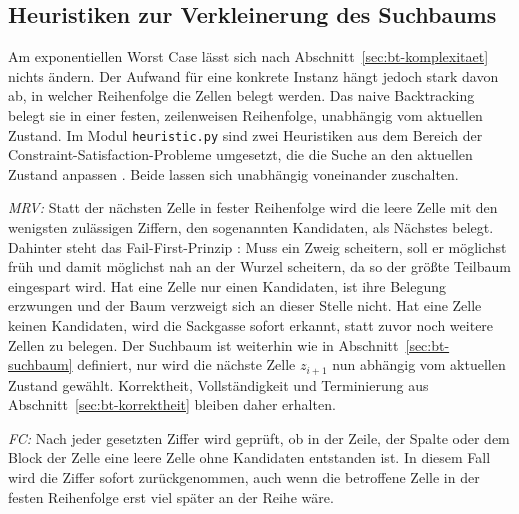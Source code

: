 \subsection{Heuristiken zur Verkleinerung des Suchbaums}\label{sec:bt-heuristiken}

Am exponentiellen Worst Case lässt sich nach Abschnitt~\ref{sec:bt-komplexitaet} nichts ändern. 
Der Aufwand für eine konkrete Instanz hängt jedoch stark davon ab, in welcher Reihenfolge die Zellen belegt werden. 
Das naive Backtracking belegt sie in einer festen, zeilenweisen Reihenfolge, unabhängig vom aktuellen Zustand. 
Im Modul \texttt{heuristic.py} sind zwei Heuristiken aus dem Bereich der Constraint-Satisfaction-Probleme umgesetzt, 
die die Suche an den aktuellen Zustand anpassen . 
Beide lassen sich unabhängig voneinander zuschalten.

\emph{\ac{MRV}:} Statt der nächsten Zelle in fester Reihenfolge wird die leere Zelle 
mit den wenigsten zulässigen Ziffern, den sogenannten Kandidaten, als Nächstes belegt. 
Dahinter steht das Fail-First-Prinzip : 
Muss ein Zweig scheitern, soll er möglichst früh und damit möglichst nah an der Wurzel scheitern, 
da so der größte Teilbaum eingespart wird. 
Hat eine Zelle nur einen Kandidaten, ist ihre Belegung erzwungen und der Baum verzweigt sich an dieser Stelle nicht. 
Hat eine Zelle keinen Kandidaten, wird die Sackgasse sofort erkannt, statt zuvor noch weitere Zellen zu belegen. 
Der Suchbaum ist weiterhin wie in Abschnitt~\ref{sec:bt-suchbaum} definiert, 
nur wird die nächste Zelle $z_{i+1}$ nun abhängig vom aktuellen Zustand gewählt. 
Korrektheit, Vollständigkeit und Terminierung aus Abschnitt~\ref{sec:bt-korrektheit} bleiben daher erhalten.

\emph{\ac{FC}:} Nach jeder gesetzten Ziffer wird geprüft, 
ob in der Zeile, der Spalte oder dem Block der Zelle eine leere Zelle ohne Kandidaten entstanden ist. 
In diesem Fall wird die Ziffer sofort zurückgenommen, 
auch wenn die betroffene Zelle in der festen Reihenfolge erst viel später an der Reihe wäre.

